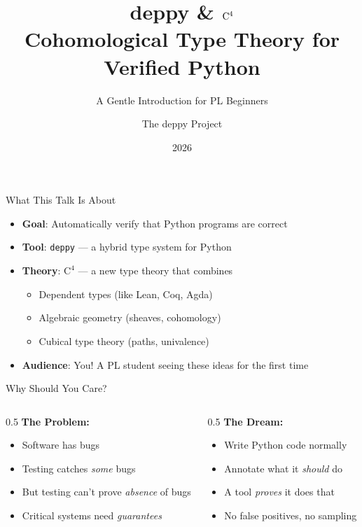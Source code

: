 \documentclass[aspectratio=169,11pt]{beamer}
\title{\textbf{deppy \& $\Cfour$} \\[6pt]
  \large Cohomological Type Theory for Verified Python}
\subtitle{A Gentle Introduction for PL Beginners}
\author{The deppy Project}
\date{2026}
\newcommand{\Cfour}{\mathrm{C}^4}
\begin{document}

\begin{frame}
\titlepage
\end{frame}

\begin{frame}{What This Talk Is About}
\begin{itemize}
\item \textbf{Goal}: Automatically verify that Python programs are correct
\item \textbf{Tool}: \texttt{deppy} --- a hybrid type system for Python
\item \textbf{Theory}: $\Cfour$ --- a new type theory that combines
  \begin{itemize}
  \item Dependent types (like Lean, Coq, Agda)
  \item Algebraic geometry (sheaves, cohomology)
  \item Cubical type theory (paths, univalence)
  \end{itemize}
\item \textbf{Audience}: You! A PL student seeing these ideas for the first time
\end{itemize}
\end{frame}

\begin{frame}{Why Should You Care?}
\begin{columns}
\begin{column}{0.5\textwidth}
\textbf{The Problem:}
\begin{itemize}
\item Software has bugs
\item Testing catches \emph{some} bugs
\item But testing can't prove \emph{absence} of bugs
\item Critical systems need \emph{guarantees}
\end{itemize}
\end{column}
\begin{column}{0.5\textwidth}
\textbf{The Dream:}
\begin{itemize}
\item Write Python code normally
\item Annotate what it \emph{should} do
\item A tool \emph{proves} it does that
\item No false positives, no sampling
\end{itemize}
\end{column}
\end{columns}
\end{frame}
\end{document}
